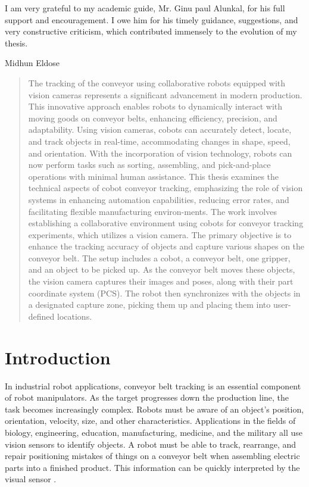 \documentclass[12pt]{article}
\begin{document}
    \vspace{1cm}

    I am very grateful to my academic guide, Mr. Ginu paul Alunkal, for his full support and encouragement. I owe him for his timely guidance, suggestions, and very constructive criticism, which contributed immensely to the evolution of my thesis.
    
    \vspace{1.5 cm}
    
    
    Midhun Eldose


\newpage
\begin{abstract}
The tracking of the conveyor using collaborative robots equipped with vision cameras represents a significant advancement in modern production. This innovative approach enables robots to dynamically interact with moving goods on conveyor belts, enhancing efficiency, precision, and adaptability. Using vision cameras, cobots can accurately detect, locate, and track objects in real-time, accommodating changes in shape, speed, and orientation. With the incorporation of vision technology, robots can now perform tasks such as sorting, assembling, and pick-and-place operations with minimal human assistance. This thesis examines the technical aspects of cobot conveyor tracking, emphasizing the role of vision systems in enhancing automation capabilities, reducing error rates, and facilitating flexible manufacturing environ-ments. The work involves establishing a collaborative environment using cobots for conveyor tracking experiments, which utilizes a vision camera. The primary objective is to enhance the tracking accuracy of objects and capture various shapes on the conveyor belt. The setup includes a cobot, a conveyor belt, one gripper, and an object to be picked up. As the conveyor belt moves these objects, the vision camera captures their images and poses, along with their part coordinate system (PCS). The robot then synchronizes with the objects in a designated capture zone, picking them up and placing them into user-defined locations. 
\end{abstract}
\newpage
\section{Introduction}
\label{introduction}

In industrial robot applications, conveyor belt tracking is an essential component of robot manipulators.  As the target progresses down the production line, the task becomes increasingly complex. Robots must be aware of an object's position, orientation, velocity, size, and other characteristics.  Applications in the fields of biology, engineering, education, manufacturing, medicine, and the military all use vision sensors to identify objects.  A robot must be able to track, rearrange, and repair positioning mistakes of things on a conveyor belt when assembling electric parts into a finished product.  This information can be quickly interpreted by the visual sensor \cite{ref12}.\\
\end{document}
